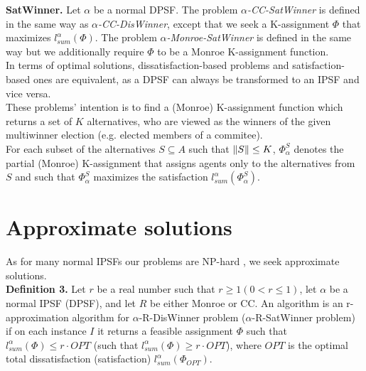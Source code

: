 \noindent
\textbf{SatWinner.} Let $\alpha$ be a normal DPSF. The problem $\alpha$\textit{-CC-SatWinner} is defined in the same way as $\alpha$\textit{-CC-DisWinner}, except that we seek a K-assignment $\Phi$ that maximizes $l^{\alpha}_{sum}(\Phi)$. The problem $\alpha$\textit{-Monroe-SatWinner} is defined in the same way but we additionally require $\Phi$ to be a Monroe K-assignment function.
\\

In terms of optimal solutions, dissatisfaction-based problems and satisfaction-based ones are equivalent, as a DPSF can always be transformed to an IPSF and vice versa.
\\

These problems' intention is to find a (Monroe) K-assignment function which returns a set of $K$ alternatives, who are viewed as the winners of the given multiwinner election (e.g. elected members of a commitee).
\\

For each subset of the alternatives $S \subseteq A$ such that $\lVert S\rVert \leq K$, $\Phi^{S}_{\alpha}$ denotes the partial (Monroe) K-assignment that assigns agents only to the alternatives from $S$ and such that $\Phi^{S}_{\alpha}$ maximizes the satisfaction $l^{\alpha}_{sum}(\Phi^{S}_{\alpha})$.

\section{Approximate solutions}

As for many normal IPSFs our problems are NP-hard \cite{2}, we seek approximate solutions.
\\

\noindent
\textbf{Definition 3.} Let $r$ be a real number such that $r \geq 1 (0 < r \leq 1)$, let $\alpha$ be a normal IPSF (DPSF), and let $R$ be either Monroe or CC. An algorithm is an r-approximation algorithm for $\alpha$-R-DisWinner problem ($\alpha$-R-SatWinner problem) if on each instance $I$ it returns a feasible assignment $\Phi$ such that $l^{\alpha}_{sum}(\Phi) \leq r \cdot OPT$ (such that $l^{\alpha}_{sum}(\Phi) \geq r \cdot OPT$), where $OPT$ is the optimal total dissatisfaction (satisfaction) $l^{\alpha}_{sum}(\Phi_{OPT})$.
\\
